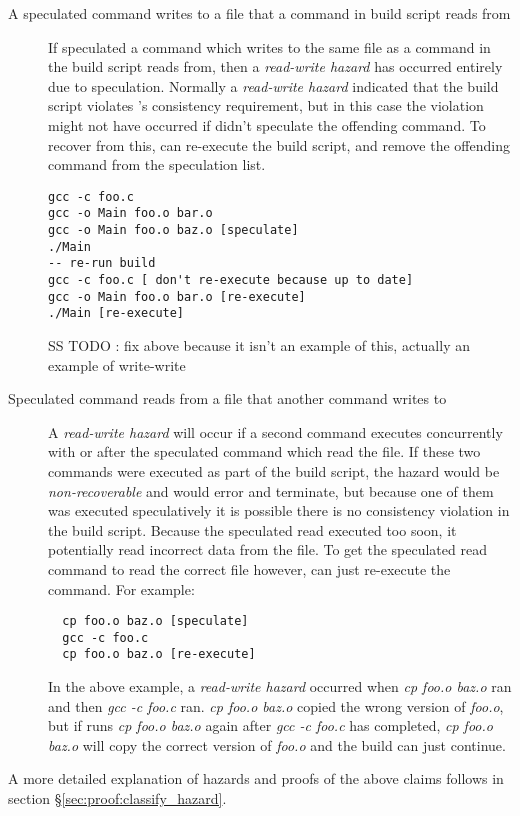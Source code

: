 \begin{description}
\item [A speculated command writes to a file that a command in build script reads from]
  If \Rattle speculated a command which writes to the same file as a command in the build script reads from, then a \emph{read-write hazard} has occurred entirely due to speculation.  Normally a \emph{read-write hazard} indicated that the build script violates \Rattle's consistency requirement, but in this case the violation might not have occurred if \Rattle didn't speculate the offending command.  To recover from this, \Rattle can re-execute the build script, and remove the offending command from the speculation list.

\begin{verbatim}
gcc -c foo.c
gcc -o Main foo.o bar.o
gcc -o Main foo.o baz.o [speculate]
./Main
-- re-run build
gcc -c foo.c [ don't re-execute because up to date]
gcc -o Main foo.o bar.o [re-execute]
./Main [re-execute]
\end{verbatim}

SS TODO : fix above because it isn't an example of this, actually an example of write-write


\item [Speculated command reads from a file that another command writes to]
    A \emph{read-write hazard} will occur if a second command executes concurrently with or after the speculated command which read the file.  If these two commands were executed as part of the build script, the hazard would be \emph{non-recoverable} and \Rattle would error and terminate, but because one of them was executed speculatively it is possible there is no consistency violation in the build script.  Because the speculated read executed too soon, it potentially read incorrect data from the file.  To get the speculated read command to read the correct file however, \Rattle can just re-execute the command. For example:

\begin{verbatim}
  cp foo.o baz.o [speculate]
  gcc -c foo.c
  cp foo.o baz.o [re-execute]
\end{verbatim}

In the above example, a \emph{read-write hazard} occurred when \emph{cp foo.o baz.o} ran and then \emph{gcc -c foo.c} ran.  \emph{cp foo.o baz.o} copied the wrong version of \emph{foo.o}, but if \Rattle
runs \emph{cp foo.o baz.o} again after \emph{gcc -c foo.c} has completed, \emph{cp foo.o baz.o} will copy the correct version of \emph{foo.o} and the build can just continue.
\end{description}

A more detailed explanation of hazards and proofs of the above claims follows in section \S\ref{sec:proof:classify_hazard}.


